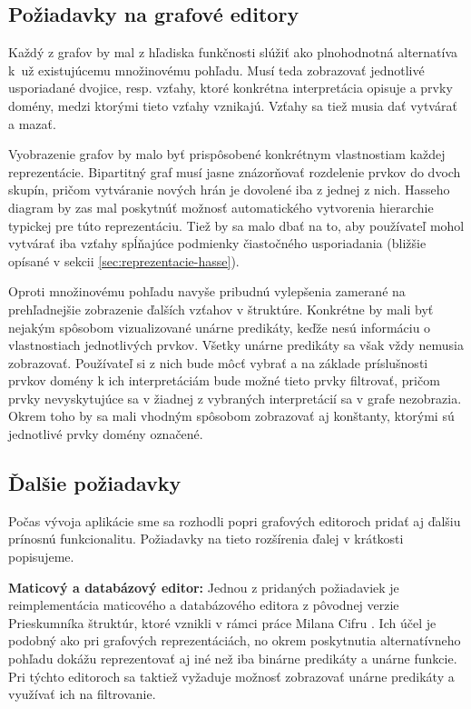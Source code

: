 \subsection{Požiadavky na grafové editory}
Každý z grafov by mal z hľadiska funkčnosti slúžiť ako plnohodnotná alternatíva k~už existujúcemu množinovému pohľadu. Musí teda zobrazovať jednotlivé usporiadané dvojice, resp. vzťahy, ktoré konkrétna interpretácia opisuje a prvky domény, medzi ktorými tieto vzťahy vznikajú. Vzťahy sa tiež musia dať vytvárať a mazať.

Vyobrazenie grafov by malo byť prispôsobené konkrétnym vlastnostiam každej reprezentácie. Bipartitný graf musí jasne znázorňovať rozdelenie prvkov do dvoch skupín, pričom vytváranie nových hrán je dovolené iba z jednej z nich. Hasseho diagram by zas mal poskytnúť možnosť automatického vytvorenia hierarchie typickej pre túto reprezentáciu. Tiež by sa malo dbať na to, aby používateľ mohol vytvárať iba vzťahy spĺňajúce podmienky čiastočného usporiadania (bližšie opísané v sekcii \ref{sec:reprezentacie-hasse}).

Oproti množinovému pohľadu navyše pribudnú vylepšenia zamerané na prehľadnejšie zobrazenie ďalších vzťahov v štruktúre. Konkrétne by mali byť nejakým spôsobom vizualizované unárne predikáty, keďže nesú informáciu o vlastnostiach jednotlivých prvkov. Všetky unárne predikáty sa však vždy nemusia zobrazovať. Používateľ si z nich bude môcť vybrať a na základe príslušnosti prvkov domény k ich interpretáciám bude možné tieto prvky filtrovať, pričom prvky nevyskytujúce sa v žiadnej z vybraných interpretácií sa v grafe nezobrazia. Okrem toho by sa mali vhodným spôsobom zobrazovať aj konštanty, ktorými sú jednotlivé prvky domény označené.

\subsection{Ďalšie požiadavky}
Počas vývoja aplikácie sme sa rozhodli popri grafových editoroch pridať aj ďalšiu prínosnú funkcionalitu. Požiadavky na tieto rozšírenia ďalej v krátkosti popisujeme.

\textbf{Maticový a databázový editor:} Jednou z pridaných požiadaviek je reimplementácia maticového a databázového editora z pôvodnej verzie Prieskumníka štruktúr, ktoré vznikli v rámci práce Milana Cifru \cite{cifra2018}. Ich účel je podobný ako pri grafových reprezentáciách, no okrem poskytnutia alternatívneho pohľadu dokážu reprezentovať aj iné než iba binárne predikáty a unárne funkcie. Pri týchto editoroch sa taktiež vyžaduje možnosť zobrazovať unárne predikáty a využívať ich na filtrovanie.

